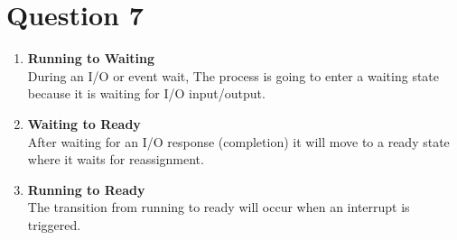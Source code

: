 \documentclass[11pt]{article}
\begin{document}
\section*{Question 7}
\begin{enumerate}
    \item \textbf{Running to Waiting}\\
        During an I/O or event wait, The process is going to enter a 
        waiting state because it is waiting for I/O input/output.
    \item \textbf{Waiting to Ready}\\
        After waiting for an I/O response (completion) it 
        will move to a ready state where it waits for 
        reassignment.
    \item \textbf{Running to Ready}\\
        The transition from running to ready will 
        occur when an interrupt is triggered. 
\end{enumerate}
\end{document}
